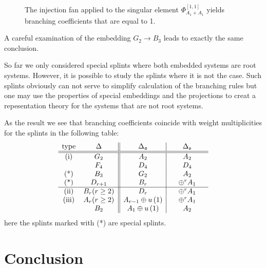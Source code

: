 \documentclass[12pt]{article}
\newcommand{\sfr}{\mathfrak{s}}
\begin{document}
\begin{figure}[h]
\begin{center}
\begin{minipage}[h]{0.47\linewidth}
\caption{The injection fan applied to the singular element $\Phi_{A_1+A_1}^{[1,1]}$ yields branching coefficients that are equal to 1.}
\label{ris2}
\end{minipage}
\end{center}
\end{figure}

A careful examination of the embedding $G_{2}\to B_{3}$ leads to exactly the same conclusion. 

So far we only considered special splints where both embedded systems are root systems. However, it
is possible to study the splints where it is not the case. Such splints obviously can not serve to
simplify calculation of the branching rules but one may use the properties of special embeddings and
the projections to creat a repesentation theory for the systems that are not root systems.

As the result we see that branching coefficients coincide with weight multiplicities for the splints
in the following table:
\begin{equation}
\label{tab:2}
\begin{array}{cc||c|c}
\hbox{type} & \hspace{0.25in}\Delta \hspace{0.25in} & \hspace{0.25in}\Delta
_{\frak{a}}\hspace{0.25in} & \hspace{0.25in}\Delta _{\sfr}\hspace{0.25in}
\\ \hline\hline
\hbox{(i)} & G_{2} & A_{2} & A_{2} \\
& F_{4} & D_{4} & D_{4} \\ 
\hbox{(*)} & B_{3} & G_{2} & A_{2}  \\
\hbox{(*)} & D_{r+1} & B_{r} & \oplus ^{r}A_{1}  \\
\hline
\hbox{(ii)} & B_{r}(r\geq 2) & D_{r} & \oplus ^{r}A_{1} \\
\hbox{(iii)} & A_{r}(r\geq 2) & A_{r-1}\oplus u\left( 1\right)  & \oplus
^{r}A_{1} \\
& B_{2} & A_{1}\oplus u\left( 1\right)  & A_{2}
\end{array}
\end{equation} 
here the splints marked with (*) are special splints.


\section{Conclusion}
\label{sec:conclusion}
\end{document}
